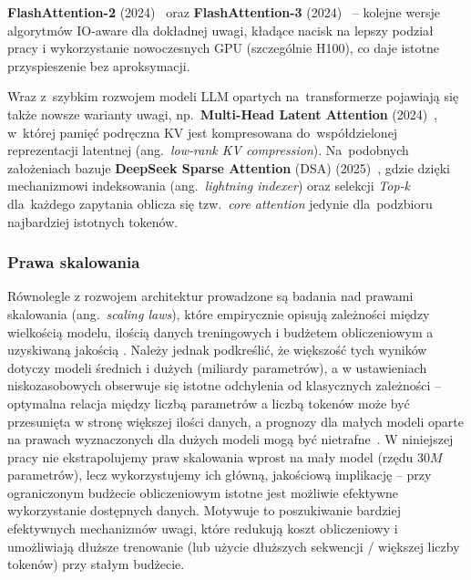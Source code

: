 \documentclass[a4paper,11pt,twoside]{report}
\theoremstyle{definition}
\begin{document}
\textbf{FlashAttention-2} (2024)~\cite{dao2024flashattention} oraz \textbf{FlashAttention-3} (2024)~\cite{shah2024flashattention} -- kolejne wersje algorytmów IO-aware dla dokładnej uwagi, kładące nacisk na lepszy podział pracy i wykorzystanie nowoczesnych GPU (szczególnie H100), co daje istotne przyspieszenie bez aproksymacji.

Wraz z~szybkim rozwojem modeli LLM opartych na~transformerze pojawiają się także nowsze warianty uwagi, np.\ \textbf{Multi-Head Latent Attention} (2024)~\cite{liu2024deepseek}, w~której pamięć podręczna KV jest kompresowana do~współdzielonej reprezentacji latentnej (ang.\ \emph{low-rank KV compression}). Na~podobnych założeniach bazuje \textbf{DeepSeek Sparse Attention} (DSA) (2025)~\cite{liu2025deepseek}, gdzie dzięki mechanizmowi indeksowania (ang.\ \emph{lightning indexer}) oraz selekcji \textit{Top-k} dla~każdego zapytania oblicza się tzw.\ \emph{core attention} jedynie dla~podzbioru najbardziej istotnych tokenów.


\subsubsection{Prawa skalowania}

Równolegle z rozwojem architektur prowadzone są badania nad prawami skalowania (ang.\ \emph{scaling laws}),
które empirycznie opisują zależności między wielkością modelu, ilością danych treningowych i budżetem obliczeniowym
a uzyskiwaną jakością \cite{kaplan2020scalinglawsneurallanguage,hoffmann2022training}.
Należy jednak podkreślić, że większość tych wyników dotyczy modeli średnich i dużych (miliardy parametrów),
a w ustawieniach niskozasobowych obserwuje się istotne odchylenia od klasycznych zależności --
optymalna relacja między liczbą parametrów a liczbą tokenów może być przesunięta w stronę większej ilości danych, a prognozy dla małych modeli oparte na prawach wyznaczonych dla dużych modeli
mogą być nietrafne~\cite{urbizu-etal-2023-scaling}.
W niniejszej pracy nie ekstrapolujemy praw skalowania wprost na mały model (rzędu $30M$ parametrów),
lecz wykorzystujemy ich główną, jakościową implikację -- przy ograniczonym budżecie obliczeniowym
istotne jest możliwie efektywne wykorzystanie dostępnych danych. Motywuje to poszukiwanie bardziej efektywnych mechanizmów uwagi, które redukują koszt obliczeniowy
i umożliwiają dłuższe trenowanie (lub użycie dłuższych sekwencji / większej liczby tokenów) przy stałym budżecie.
\end{document}
